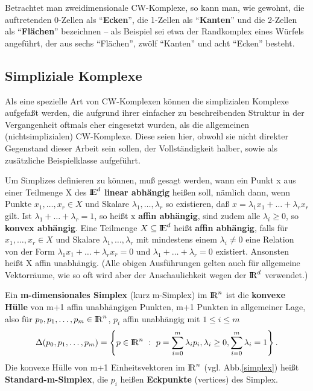 Betrachtet man zweidimensionale CW-Komplexe, so kann man, wie gewohnt, die
auftretenden 0-Zellen als "`{\bf Ecken}"', die 1-Zellen als "`{\bf Kanten}"'
und die 2-Zellen als "`{\bf Flächen}"' bezeichnen -- als Beispiel sei etwa
der Randkomplex eines Würfels angeführt, der aus sechs "`Flächen"', zwölf
"`Kanten"' und acht "`Ecken"' besteht.

\subsection{Simpliziale Komplexe}

Als eine spezielle Art von CW-Komplexen können die simplizialen Komplexe
aufgefaßt werden, die aufgrund ihrer einfacher zu beschreibenden Struktur
in der Vergangenheit oftmals eher eingesetzt wurden, als die
allgemeinen (nichtsimplizialen) CW-Komplexe. Diese seien hier, obwohl sie nicht
direkter Gegenstand dieser Arbeit sein sollen, der Vollständigkeit halber,
sowie als zusätzliche Beispielklasse aufgeführt.

Um Simplizes definieren zu können, muß gesagt werden, wann ein Punkt
x aus einer Teilmenge X des $\mbox{$\rm I\!E$}^d$ {\bf linear abhängig} heißen soll, nämlich
dann, wenn Punkte $x_1,\ldots,x_r\in X$ und Skalare $\lambda_1,\ldots,\lambda_r$
so existieren, daß $x=\lambda_1x_1+\ldots+\lambda_rx_r$ gilt. Ist
$\lambda_1+\ldots+\lambda_r=1$, so heißt x {\bf affin abhängig}, sind zudem
alle $\lambda_i\geq 0$, so {\bf konvex abhängig}. Eine Teilmenge
$X\subseteq\mbox{$\rm I\!E$}^d$ heißt {\bf affin abhängig}, falls für $x_1,\ldots,x_r\in X$
und Skalare $\lambda_1,\ldots,\lambda_r$ mit mindestens einem $\lambda_i\neq 0$
eine Relation von der Form $\lambda_1x_1+\ldots+\lambda_rx_r=0$ und
$\lambda_1+\ldots+\lambda_r=0$ existiert. Ansonsten heißt X affin unabhängig.
(Alle obigen Ausführungen gelten auch für allgemeine Vektorräume, wie
so oft wird aber der Anschaulichkeit wegen der $\mbox{$\rm I\!R$}^d$ verwendet.)

Ein {\bf m-dimensionales Simplex} (kurz m-Sim\-plex)
im $\mbox{$\rm I\!R$}^n$ ist die {\bf konvexe Hülle} von m+1 affin unabhängigen Punkten, m+1
Punkten in allgemeiner Lage, also für $p_0,p_1,\ldots,p_m\in\mbox{$\rm I\!R$}^n$, $p_i$
affin unabhängig mit $1\leq i\leq m$
$$
   \Delta(p_0,p_1,\ldots,p_m) =
   \left\{ p\in\mbox{$\rm I\!R$}^n~:~p = \sum\limits_{i=0}^m \lambda_i p_i, \lambda_i\geq 0,
   \sum\limits_{i=0}^m \lambda_i = 1\right\}.
$$
Die konvexe Hülle von m+1 Einheitsvektoren im $\mbox{$\rm I\!R$}^n$ (vgl. Abb.\ref{simplex})
heißt {\bf Standard-m-Simplex}, die $p_i$ heißen
{\bf Eckpunkte} (vertices) des Simplex.

